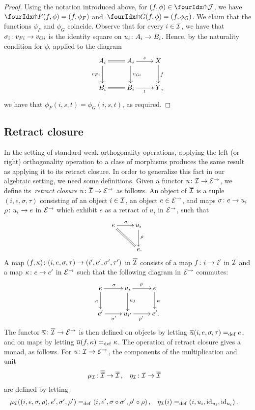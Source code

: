 \documentclass[reqno,10pt,a4paper,oneside,draft]{amsart}
\begin{document}
\begin{proof} Using the notation introduced above, for $(f, \phi) \in \liftr{\cal{J}}$, we have $\liftr{F}(f, \phi) = (f, \phi_F)$ and~$\liftr{G}(f, \phi) = (f, \phi_G)$.
We claim that the functions $\phi_F$ and $\phi_G$ coincide.
Observe that for every $i \in \cal{I}$, we have that $\sigma_i \co v_{Fi} \to v_{Gi}$ is the identity square on $u_i \co A_i \to B_i$.
Hence, by the naturality condition for $\phi$, applied to the diagram
\[
\xymatrix{
  A_i
  \ar@{=}[r]
  \ar[d]_{v_{Fi}}
&
  A_i
  \ar[d]^{v_{Gi}}
  \ar[r]^{s}
&
  X
  \ar[d]^{f}
\\
  B_i
  \ar@{=}[r]
&
  B_i
  \ar[r]_{t}
&
  Y
\rlap{,}}
\]
we have that $\phi_F(i, s, t) = \phi_G(i, s, t)$, as required.
\end{proof}

\subsection*{Retract closure}

In the setting of standard weak orthogonality operations, applying the left (or right) orthogonality operation to a class of morphisms produces the same result as applying it to its retract closure.
In order to generalize this fact in our algebraic setting, we need some definitions.
Given a functor $u \co \cal{I} \to \calE^\to$, we define its~\emph{retract closure} $\overline{u} \co \overline{\cal{I}} \to \catE^\to$ as follows.
An object of $\overline{\cal{I}}$ is a tuple~$(i, e, \sigma, \tau)$ consisting of an object $i \in \cal{I}$, an object $e \in \catE^\to$, and maps $\sigma \co e \rightarrow u_i$ $\rho \co u_i \rightarrow e$ in $\catE^\to$ which exhibit $e$ as a retract of $u_i$ in $\catE^\to$, \ie such that
\[
\xymatrix{
  e
  \ar[r]^{\sigma}
  \ar@{=}[dr]
&
  u_i
  \ar[d]^{\rho}
\\&
  e
\rlap{.}}
\]
A map $(f, \kappa) \co (i, e, \sigma, \tau) \to (i', e', \sigma', \tau')$ in $\overline{\cal{I}}$ consists of a map $f \co i \to i'$ in $\cal{I}$ and a map $\kappa \co e \rightarrow e'$ in $\catE^\to$ such that the following diagram in $\catE^\to$ commutes:
\[
\xymatrix{
  e
  \ar[r]^{\sigma}
  \ar[d]_{\kappa}
&
  u_i
  \ar[r]^{\rho}
  \ar[d]^{u_f}
&
  e
  \ar[d]^{\kappa}
\\
  e'
  \ar[r]_{\sigma'}
&
  u_{i'}
  \ar[r]_{\rho'}
&
  e'
\rlap{.}}
\]
The functor $\overline{u} \co \overline{\cal{I}} \to \catE^\to$ is then defined on objects by letting $\overline{u}(i, e, \sigma, \tau) \defeq e$, and on maps by letting $\overline{u}(f, \kappa) \defeq \kappa$.
The operation of retract closure gives a monad, as follows.
For $u \co \cal{I} \to \catE^\to$, the components of the multiplication and unit
\[
\begin{aligned}
  \mu_\cal{I} &\co \overline{\overline{\cal{I}}} \to \overline{\cal{I}}
\, , &
  \eta_\cal{I} &\co \cal{I} \to \overline{\cal{I}}
\end{aligned}
\]
are defined by letting
\[
\begin{aligned}
  \mu_\cal{I}((i, e, \sigma, \rho), e', \sigma', \rho') &\defeq (i, e', \sigma \cc \sigma', \rho' \cc \rho)
\, , &
  \eta_\cal{I}(i) &\defeq (i, u_i, \id_{u_i}, \id_{u_i})
\, .
\end{aligned}
\]
\end{document}
